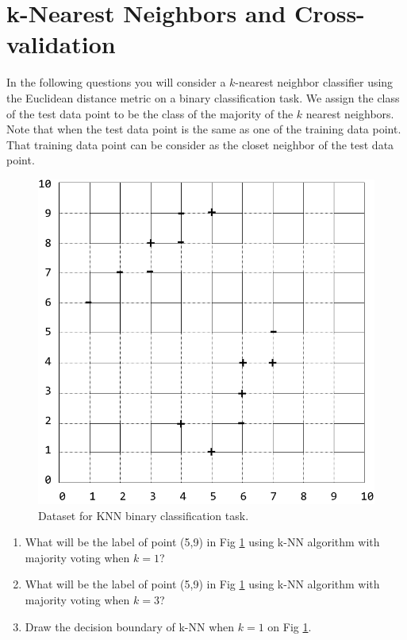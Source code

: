 \section{k-Nearest Neighbors and Cross-validation }
In the following questions you will consider a $k$-nearest neighbor classifier using the Euclidean distance metric on a binary classification task. We assign the class of the test data point to be the class of the majority of the $k$ nearest neighbors. Note that when the test data point is the same as one of the training data point. That training data point can be consider as the closet neighbor of the test data point. 

\begin{figure}[h]
    \centering
    \includegraphics[scale=0.8]{knn_figure.pdf}
    \caption{Dataset for KNN binary classification task.}
    \label{fig:knn}
\end{figure}

\begin{enumerate}
 \item {} 
        What will be the label of point (5,9) in Fig \ref{fig:knn} using k-NN algorithm with majority voting when $k=1$?


    \item {} 
        What will be the label of point (5,9) in Fig \ref{fig:knn} using k-NN algorithm with majority voting when $k=3$?

    \item {}
        Draw the decision boundary of k-NN when $k=1$ on Fig \ref{fig:knn}.

\end{enumerate}